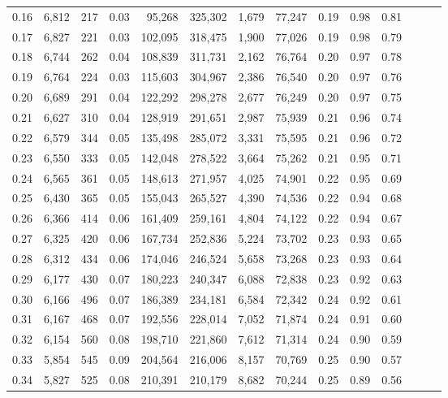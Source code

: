 \begin{tabular}{rrrrrrrrrrrrrr}
0.16 &  6,812 &    217 &  0.03 &   95,268 &  325,302 &   1,679 &  77,247 &  0.19 &  0.98 &      0.81 \\
0.17 &  6,827 &    221 &  0.03 &  102,095 &  318,475 &   1,900 &  77,026 &  0.19 &  0.98 &      0.79 \\
0.18 &  6,744 &    262 &  0.04 &  108,839 &  311,731 &   2,162 &  76,764 &  0.20 &  0.97 &      0.78 \\
0.19 &  6,764 &    224 &  0.03 &  115,603 &  304,967 &   2,386 &  76,540 &  0.20 &  0.97 &      0.76 \\
0.20 &  6,689 &    291 &  0.04 &  122,292 &  298,278 &   2,677 &  76,249 &  0.20 &  0.97 &      0.75 \\
0.21 &  6,627 &    310 &  0.04 &  128,919 &  291,651 &   2,987 &  75,939 &  0.21 &  0.96 &      0.74 \\
0.22 &  6,579 &    344 &  0.05 &  135,498 &  285,072 &   3,331 &  75,595 &  0.21 &  0.96 &      0.72 \\
0.23 &  6,550 &    333 &  0.05 &  142,048 &  278,522 &   3,664 &  75,262 &  0.21 &  0.95 &      0.71 \\
0.24 &  6,565 &    361 &  0.05 &  148,613 &  271,957 &   4,025 &  74,901 &  0.22 &  0.95 &      0.69 \\
0.25 &  6,430 &    365 &  0.05 &  155,043 &  265,527 &   4,390 &  74,536 &  0.22 &  0.94 &      0.68 \\
0.26 &  6,366 &    414 &  0.06 &  161,409 &  259,161 &   4,804 &  74,122 &  0.22 &  0.94 &      0.67 \\
0.27 &  6,325 &    420 &  0.06 &  167,734 &  252,836 &   5,224 &  73,702 &  0.23 &  0.93 &      0.65 \\
0.28 &  6,312 &    434 &  0.06 &  174,046 &  246,524 &   5,658 &  73,268 &  0.23 &  0.93 &      0.64 \\
0.29 &  6,177 &    430 &  0.07 &  180,223 &  240,347 &   6,088 &  72,838 &  0.23 &  0.92 &      0.63 \\
0.30 &  6,166 &    496 &  0.07 &  186,389 &  234,181 &   6,584 &  72,342 &  0.24 &  0.92 &      0.61 \\
0.31 &  6,167 &    468 &  0.07 &  192,556 &  228,014 &   7,052 &  71,874 &  0.24 &  0.91 &      0.60 \\
0.32 &  6,154 &    560 &  0.08 &  198,710 &  221,860 &   7,612 &  71,314 &  0.24 &  0.90 &      0.59 \\
0.33 &  5,854 &    545 &  0.09 &  204,564 &  216,006 &   8,157 &  70,769 &  0.25 &  0.90 &      0.57 \\
0.34 &  5,827 &    525 &  0.08 &  210,391 &  210,179 &   8,682 &  70,244 &  0.25 &  0.89 &      0.56 \\

\end{tabular}
